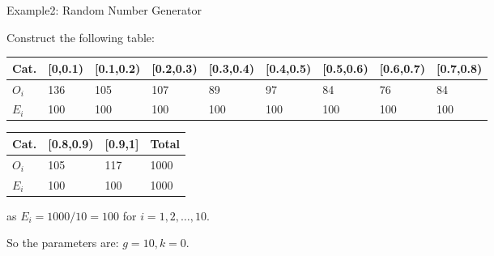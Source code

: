 \documentclass[t,xcolor=pdftex,dvipsnames,table]{beamer}
\begin{document}
\begin{frame}[fragile]{Example2: Random Number Generator}

Construct the following table:

\vspace{.5cm}
{\tiny 
\begin{tabular}{l|llllllll}  \hline
Cat. & [0,0.1) &  [0.1,0.2) & [0.2,0.3) & [0.3,0.4) & [0.4,0.5) & [0.5,0.6) & [0.6,0.7) & [0.7,0.8)  \\ \hline
$O_{i}$ & 136 & 105 & 107 & 89 & 97 & 84 & 76 & 84    \\ \hline
$E_{i}$ & 100 & 100 & 100 & 100 & 100 & 100 & 100 & 100    \\ \hline
\end{tabular}
}

\vspace{.5cm}
{\tiny 
\begin{tabular}{l|lll}  \hline
Cat. & [0.8,0.9) &  [0.9,1] & Total \\ \hline
$O_{i}$ & 105  & 117  & 1000      \\ \hline
$E_{i}$ & 100  & 100  & 1000      \\ \hline
\end{tabular}
} 

\vspace{.5cm}
as $E_{i} = 1000/10 = 100$ for $i=1,2,\ldots,10$. 

\vspace{.5cm}
So the parameters are: $g=10, k=0$.
\end{frame} 
\end{document}
